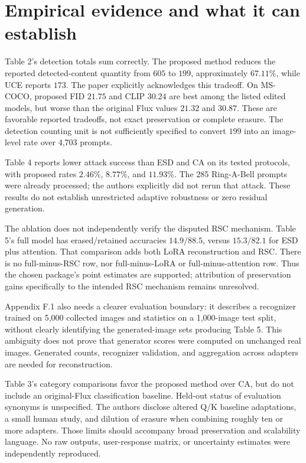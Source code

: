 \documentclass[10pt]{article}
\begin{document}
\section*{Empirical evidence and what it can establish}
Table 2’s detection totals sum correctly. The proposed method reduces the reported detected-content quantity from \(605\) to \(199\), approximately \(67.11\%\), while UCE reports \(173\). The paper explicitly acknowledges this tradeoff. On MS-COCO, proposed FID \(21.75\) and CLIP \(30.24\) are best among the listed edited models, but worse than the original Flux values \(21.32\) and \(30.87\). These are favorable reported tradeoffs, not exact preservation or complete erasure. The detection counting unit is not sufficiently specified to convert \(199\) into an image-level rate over 4,703 prompts.\par
Table 4 reports lower attack success than ESD and CA on its tested protocols, with proposed rates \(2.46\%\), \(8.77\%\), and \(11.93\%\). The 285 Ring-A-Bell prompts were already processed; the authors explicitly did not rerun that attack. These results do not establish unrestricted adaptive robustness or zero residual generation.\par
The ablation does not independently verify the disputed RSC mechanism. Table 5’s full model has erased/retained accuracies \(14.9/88.5\), versus \(15.3/82.1\) for ESD plus attention. That comparison adds both LoRA reconstruction and RSC. There is no full-minus-RSC row, nor full-minus-LoRA or full-minus-attention row. Thus the chosen package’s point estimates are supported; attribution of preservation gains specifically to the intended RSC mechanism remains unresolved.\par
Appendix F.1 also needs a clearer evaluation boundary: it describes a recognizer trained on 5,000 collected images and statistics on a 1,000-image test split, without clearly identifying the generated-image sets producing Table 5. This ambiguity does not prove that generator scores were computed on unchanged real images. Generated counts, recognizer validation, and aggregation across adapters are needed for reconstruction.\par
Table 3’s category comparisons favor the proposed method over CA, but do not include an original-Flux classification baseline. Held-out status of evaluation synonyms is unspecified. The authors disclose altered Q/K baseline adaptations, a small human study, and dilution of erasure when combining roughly ten or more adapters. Those limits should accompany broad preservation and scalability language. No raw outputs, user-response matrix, or uncertainty estimates were independently reproduced.\par
\end{document}
